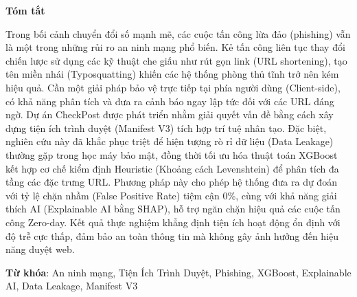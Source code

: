 \setlength{\parindent}{2em}

\begin{center}
\textbf{\large{Tóm tắt}	}
\end{center}


\begin{small}

Trong bối cảnh chuyển đổi số mạnh mẽ, các cuộc tấn công lừa đảo (phishing) vẫn là một trong những rủi ro an ninh mạng phổ biến. Kẻ tấn công liên tục thay đổi chiến lược sử dụng các kỹ thuật che giấu như rút gọn link (URL shortening), tạo tên miền nhái (Typosquatting) khiến các hệ thống phòng thủ tĩnh trở nên kém hiệu quả. Cần một giải pháp bảo vệ trực tiếp tại phía người dùng (Client-side), có khả năng phân tích và đưa ra cảnh báo ngay lập tức đối với các URL đáng ngờ. Dự án CheckPost được phát triển nhằm giải quyết vấn đề bằng cách xây dựng tiện ích trình duyệt (Manifest V3) tích hợp trí tuệ nhân tạo. Đặc biệt, nghiên cứu này đã khắc phục triệt để hiện tượng rò rỉ dữ liệu (Data Leakage) thường gặp trong học máy bảo mật, đồng thời tối ưu hóa thuật toán XGBoost kết hợp cơ chế kiểm định Heuristic (Khoảng cách Levenshtein) để phân tích đa tầng các đặc trưng URL. Phương pháp này cho phép hệ thống đưa ra dự đoán với tỷ lệ chặn nhầm (False Positive Rate) tiệm cận 0\%, cùng với khả năng giải thích AI (Explainable AI bằng SHAP), hỗ trợ ngăn chặn hiệu quả các cuộc tấn công Zero-day. Kết quả thực nghiệm khẳng định tiện ích hoạt động ổn định với độ trễ cực thấp, đảm bảo an toàn thông tin mà không gây ảnh hưởng đến hiệu năng duyệt web.

\vspace*{1cm}
\textbf{Từ khóa}: An ninh mạng, Tiện Ích Trình Duyệt, Phishing, XGBoost, Explainable AI, Data Leakage, Manifest V3

    

\end{small}